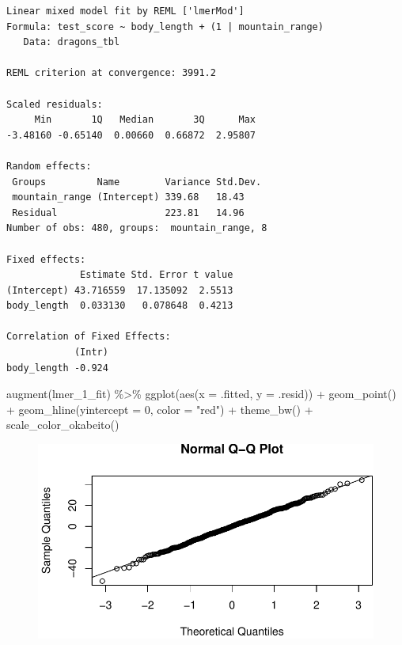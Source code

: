 \documentclass[
  letterpaper,
]{scrbook}
\newenvironment{Shaded}{\begin{snugshade}}{\end{snugshade}}
\newcommand{\AttributeTok}[1]{\textcolor[rgb]{0.40,0.45,0.13}{#1}}
\newcommand{\DecValTok}[1]{\textcolor[rgb]{0.68,0.00,0.00}{#1}}
\newcommand{\FunctionTok}[1]{\textcolor[rgb]{0.28,0.35,0.67}{#1}}
\newcommand{\NormalTok}[1]{\textcolor[rgb]{0.00,0.23,0.31}{#1}}
\newcommand{\SpecialCharTok}[1]{\textcolor[rgb]{0.37,0.37,0.37}{#1}}
\newcommand{\StringTok}[1]{\textcolor[rgb]{0.13,0.47,0.30}{#1}}
\begin{document}
\begin{verbatim}
Linear mixed model fit by REML ['lmerMod']
Formula: test_score ~ body_length + (1 | mountain_range)
   Data: dragons_tbl

REML criterion at convergence: 3991.2

Scaled residuals: 
     Min       1Q   Median       3Q      Max 
-3.48160 -0.65140  0.00660  0.66872  2.95807 

Random effects:
 Groups         Name        Variance Std.Dev.
 mountain_range (Intercept) 339.68   18.43   
 Residual                   223.81   14.96   
Number of obs: 480, groups:  mountain_range, 8

Fixed effects:
             Estimate Std. Error t value
(Intercept) 43.716559  17.135092  2.5513
body_length  0.033130   0.078648  0.4213

Correlation of Fixed Effects:
            (Intr)
body_length -0.924
\end{verbatim}

\begin{Shaded}
\begin{Highlighting}[]
\FunctionTok{augment}\NormalTok{(lmer\_1\_fit) }\SpecialCharTok{\%\textgreater{}\%} 
  \FunctionTok{ggplot}\NormalTok{(}\FunctionTok{aes}\NormalTok{(}\AttributeTok{x =}\NormalTok{ .fitted, }\AttributeTok{y =}\NormalTok{ .resid)) }\SpecialCharTok{+} 
  \FunctionTok{geom\_point}\NormalTok{() }\SpecialCharTok{+}
  \FunctionTok{geom\_hline}\NormalTok{(}\AttributeTok{yintercept =} \DecValTok{0}\NormalTok{, }\AttributeTok{color =} \StringTok{"red"}\NormalTok{) }\SpecialCharTok{+}
  \FunctionTok{theme\_bw}\NormalTok{() }\SpecialCharTok{+}
  \FunctionTok{scale\_color\_okabeito}\NormalTok{()}
\end{Highlighting}
\end{Shaded}

\begin{figure}[H]

{\centering \includegraphics{./stat-modeling-mixed_files/figure-pdf/unnamed-chunk-15-1.pdf}

}

\end{figure}
\end{document}

